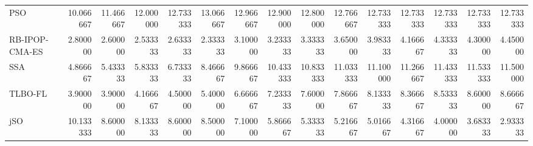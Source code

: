 \begin{tabular}{lrrrrrrrrrrrrrr}
PSO            &  10.066667 &  11.466667 &  12.000000 &  12.733333 &  13.066667 &  12.966667 &  12.900000 &  12.800000 &  12.766667 &  12.733333 &  12.733333 &  12.733333 &  12.733333 &  12.733333 \\
RB-IPOP-CMA-ES &   2.800000 &   2.600000 &   2.533333 &   2.633333 &   2.333333 &   3.100000 &   3.233333 &   3.333333 &   3.650000 &   3.983333 &   4.166667 &   4.333333 &   4.300000 &   4.450000 \\
SSA            &   4.866667 &   5.433333 &   5.833333 &   6.733333 &   8.466667 &   9.866667 &  10.433333 &  10.833333 &  11.033333 &  11.100000 &  11.266667 &  11.433333 &  11.533333 &  11.500000 \\
TLBO-FL        &   3.900000 &   3.900000 &   4.166667 &   4.500000 &   5.400000 &   6.666667 &   7.233333 &   7.600000 &   7.866667 &   8.133333 &   8.366667 &   8.533333 &   8.600000 &   8.666667 \\
jSO            &  10.133333 &   8.600000 &   8.133333 &   8.600000 &   8.500000 &   7.100000 &   5.866667 &   5.333333 &   5.216667 &   5.016667 &   4.316667 &   4.000000 &   3.683333 &   2.933333 \\
\bottomrule
\end{tabular}
